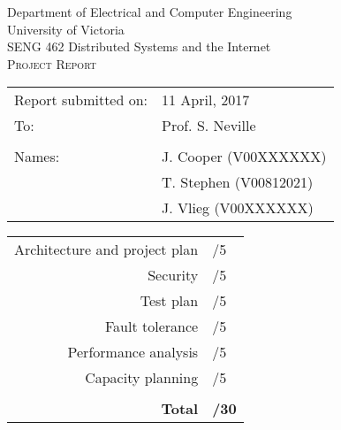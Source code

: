 \begin{titlepage}

  \begin{center}
    \begin{LARGE}
      Department of Electrical and Computer Engineering \\
      University of Victoria \\
      SENG 462 \textemdash{} Distributed Systems and the Internet \\[1cm]
      \textsc{Project Report}
      \\[1in]
    \end{LARGE}
  \end{center}

  \begin{tabular}{ p{} p{} }
    Report submitted on:& 11 April, 2017 \\
    To: & Prof. S. Neville \\
    & \\
    Names: & J. Cooper (V00XXXXXX)\\
    & T. Stephen (V00812021)\\
    & J. Vlieg (V00XXXXXX)\\[1in]
  \end{tabular}

  \begin{center}
    \begin{tabular}{rl}
      Architecture and project plan & \markline{} /5 \\
      Security & \markline{} /5 \\
      Test plan & \markline{} /5 \\
      Fault tolerance & \markline{} /5 \\
      Performance analysis & \markline{} /5 \\
      Capacity planning & \markline{} /5 \\
      & \\
      \textbf{Total} & \markline{} \textbf{/30} \\
    \end{tabular}
  \end{center}

\end{titlepage}
